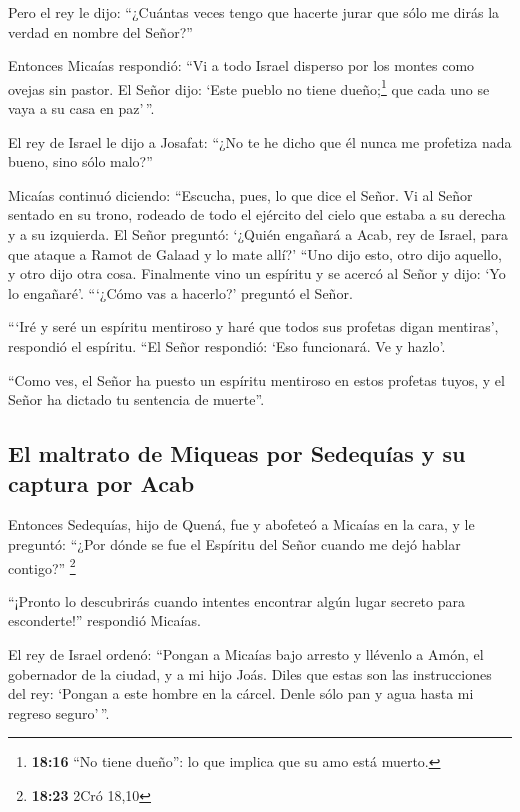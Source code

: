  Pero el rey le dijo: ``¿Cuántas veces tengo que hacerte
jurar que sólo me dirás la verdad en nombre del Señor?''

 Entonces Micaías respondió: ``Vi a todo Israel disperso
por los montes como ovejas sin pastor. El Señor dijo: `Este pueblo no
tiene dueño;\footnote{\textbf{18:16} ``No tiene dueño'': lo que implica
  que su amo está muerto.} que cada uno se vaya a su casa en paz'\,''.

 El rey de Israel le dijo a Josafat: ``¿No te he dicho
que él nunca me profetiza nada bueno, sino sólo malo?''

 Micaías continuó diciendo: ``Escucha, pues, lo que dice
el Señor. Vi al Señor sentado en su trono, rodeado de todo el ejército
del cielo que estaba a su derecha y a su izquierda.  El
Señor preguntó: `¿Quién engañará a Acab, rey de Israel, para que ataque
a Ramot de Galaad y lo mate allí?' ``Uno dijo esto, otro dijo aquello, y
otro dijo otra cosa.  Finalmente vino un espíritu y se
acercó al Señor y dijo: `Yo lo engañaré'. ```¿Cómo vas a hacerlo?'
preguntó el Señor.

 ```Iré y seré un espíritu mentiroso y haré que todos sus
profetas digan mentiras', respondió el espíritu. ``El Señor respondió:
`Eso funcionará. Ve y hazlo'.

 ``Como ves, el Señor ha puesto un espíritu mentiroso en
estos profetas tuyos, y el Señor ha dictado tu sentencia de muerte''.

\hypertarget{el-maltrato-de-miqueas-por-sedequuxedas-y-su-captura-por-acab}{%
\subsection{El maltrato de Miqueas por Sedequías y su captura por
Acab}\label{el-maltrato-de-miqueas-por-sedequuxedas-y-su-captura-por-acab}}

 Entonces Sedequías, hijo de Quená, fue y abofeteó a
Micaías en la cara, y le preguntó: ``¿Por dónde se fue el Espíritu del
Señor cuando me dejó hablar contigo?'' \footnote{\textbf{18:23} 2Cró
  18,10}

 ``¡Pronto lo descubrirás cuando intentes encontrar algún
lugar secreto para esconderte!'' respondió Micaías.

 El rey de Israel ordenó: ``Pongan a Micaías bajo arresto
y llévenlo a Amón, el gobernador de la ciudad, y a mi hijo Joás.
 Diles que estas son las instrucciones del rey: `Pongan a
este hombre en la cárcel. Denle sólo pan y agua hasta mi regreso
seguro'\,''.

